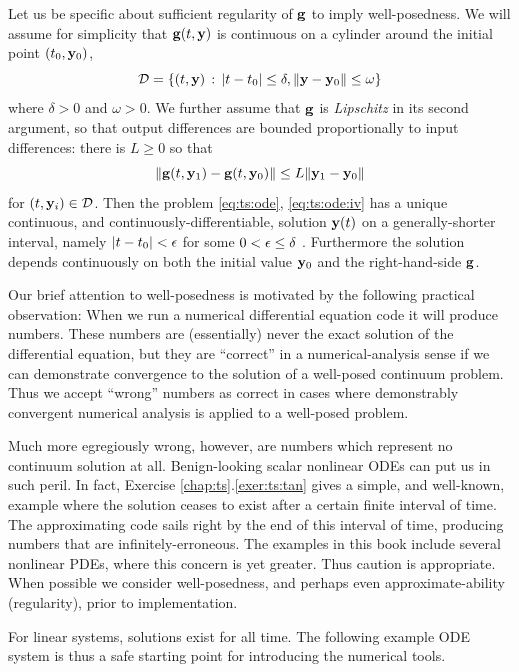 Let us be specific about sufficient regularity of $\mathbf{g}$ to imply well-posedness.  We will assume for simplicity that $\mathbf{g}(t,\mathbf{y})$ is continuous on a cylinder around the initial point $(t_0,\mathbf{y}_0)$,
   $$\mathcal{D} = \{(t,\mathbf{y}) \,:\, |t-t_0| \le \delta, \|\mathbf{y} - \mathbf{y}_0\| \le \omega\}$$
where $\delta > 0$ and $\omega > 0$.  We further assume that $\mathbf{g}$ is \emph{Lipschitz} in its second argument, so that output differences are bounded proportionally to input differences: there is $L\ge 0$ so that
\begin{equation}
\|\mathbf{g}(t,\mathbf{y}_1) - \mathbf{g}(t,\mathbf{y}_0)\| \le L \|\mathbf{y}_1-\mathbf{y}_0\|  \label{eq:ts:glipschitz}
\end{equation}
for $(t,\mathbf{y}_i) \in \mathcal{D}$.  Then the problem \eqref{eq:ts:ode}, \eqref{eq:ts:ode:iv} has a unique continuous, and continuously-differentiable, solution $\mathbf{y}(t)$ on a generally-shorter interval, namely $|t-t_0|<\epsilon$ for some $0 < \epsilon \le \delta$ \citep[section 17.5]{HirschSmaleDevaney2004}.  Furthermore the solution depends continuously on both the initial value $\mathbf{y}_0$ and the right-hand-side $\mathbf{g}$.

Our brief attention to well-posedness is motivated by the following practical observation:  When we run a numerical differential equation code it will produce numbers.  These numbers are (essentially) never the exact solution of the differential equation, but they are ``correct'' in a numerical-analysis sense if we can demonstrate convergence to the solution of a well-posed continuum problem.  Thus we accept ``wrong'' numbers as correct in cases where demonstrably convergent numerical analysis is applied to a well-posed problem.

Much more egregiously wrong, however, are numbers which represent no continuum solution at all.  Benign-looking scalar nonlinear ODEs can put us in such peril.  In fact, Exercise \ref{chap:ts}.\ref{exer:ts:tan} gives a simple, and well-known, example where the solution ceases to exist after a certain finite interval of time.  The approximating code sails right by the end of this interval of time, producing numbers that are infinitely-erroneous.  The examples in this book include several nonlinear PDEs, where this concern is yet greater.  Thus caution is appropriate.  When possible we consider well-posedness, and perhaps even approximate-ability (regularity), prior to implementation.

For linear systems, solutions exist for all time.  The following example ODE system is thus a safe starting point for introducing the numerical tools.

